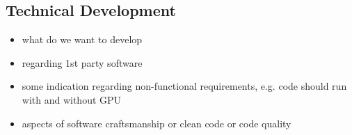 \subsection{Technical Development}

\begin{itemize}
    \item what do we want to develop                                   
    \item regarding 1st party software 
    \item some indication regarding non-functional requirements, e.g. code should run with and without GPU
    \item aspects of software craftsmanship or clean code or code quality
\end{itemize}

